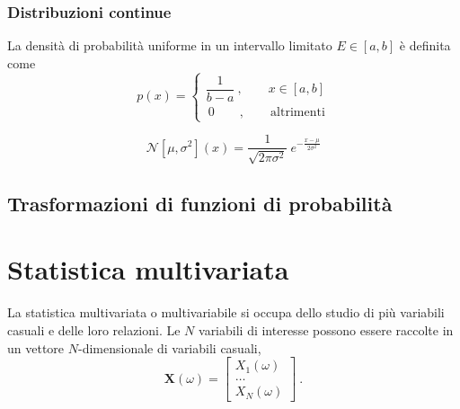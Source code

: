 \subsubsection{Distribuzioni continue}
\begin{definition} La densità di probabilità uniforme in un intervallo limitato $E \in [a,b]$ è definita come
    \begin{equation}
        p(x) = \begin{cases}
            \dfrac{1}{b-a} \ , \qquad x \in [a,b] \\
            \ 0     \qquad   , \qquad \text{altrimenti}
        \end{cases}
    \end{equation}
\end{definition}
\begin{definition}\label{def:normal-distribution} 
    \begin{equation}
       \mathcal{N}[\mu,\sigma^2](x) = \dfrac{1}{\sqrt{2 \pi \sigma^2}} \ e^{-\frac{x-\mu}{2\sigma^2}}
    \end{equation}
\end{definition}
\begin{definition}
\end{definition}
\begin{definition}
\end{definition}

\subsection{Trasformazioni di funzioni di probabilità}

\section{Statistica multivariata}
La statistica multivariata o multivariabile si occupa dello studio di più variabili casuali e delle loro relazioni. Le $N$ variabili di interesse possono essere raccolte in un vettore $N$-dimensionale di variabili casuali,
\begin{equation}
    \mathbf{X}(\omega) = \begin{bmatrix} X_1(\omega) \\ \dots \\ X_N(\omega) \end{bmatrix} \ .
\end{equation}
